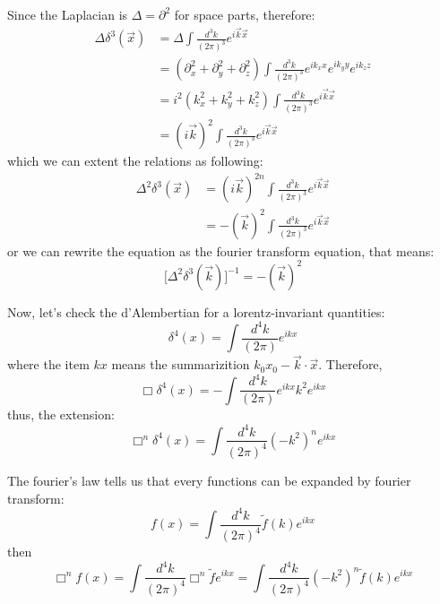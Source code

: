 \documentclass[12pt,openany]{book}
\begin{document}
	Since the Laplacian is $\Delta=\partial^2$ for space parts, therefore:
	\begin{equation*}
		\begin{aligned}
			\Delta\delta^3(\vec{x})&=\Delta\int\frac{d^3 k}{(2\pi)^3}e^{i\vec{k}\vec{x}}\\
			&=(\partial_x^2+\partial_y^2+\partial_z^2)\int\frac{d^3 k}{(2\pi)^3}e^{ik_x x}e^{ik_y y}e^{ik_z z}\\
			&=i^2(k_x^2+k_y^2+k_z^2)\int\frac{d^3 k}{(2\pi)^3}e^{i\vec{k}\vec{x}}\\
			&=(i\vec{k})^2\int\frac{d^3 k}{(2\pi)^3}e^{i\vec{k}\vec{x}}
		\end{aligned}
	\end{equation*}
	which we can extent the relations as following:
	\begin{equation}
		\begin{aligned}
			\Delta^2 \delta^3(\vec{x})&=(i\vec{k})^{2n}\int\frac{d^3 k}{(2\pi)^3}e^{i\vec{k}\vec{x}}\\
			&=-(\vec{k})^2 \int\frac{d^3 k}{(2\pi)^3}e^{i\vec{k}\vec{x}}
		\end{aligned}
	\end{equation}
	or we can rewrite the equation as the fourier transform equation, that means:
	\begin{equation}
		\big[\Delta^2 \delta^3(\vec{k})\big]^{-1}=-(\vec{k})^2
	\end{equation}\par 
	Now, let's check the d'Alembertian for a lorentz-invariant quantities:
	\begin{equation}
		\delta^4(x)=\int\frac{d^4k}{(2\pi)}e^{ikx}
	\end{equation}
	where the item $kx$ means the summarizition $k_0x_0-\vec{k}\cdot\vec{x}$. Therefore,
	\begin{equation}
		\Box \delta^4(x)=-\int\frac{d^4k}{(2\pi)}e^{ikx}k^2 e^{ikx}
	\end{equation}
	thus, the extension:
	\begin{equation}
		\Box^n\delta^4(x)=\int\frac{d^4k}{(2\pi)^4}(-k^2)^ne^{ikx}
	\end{equation}\par 
	The fourier's law tells us that every functions can be expanded by fourier transform:
	\begin{equation}
		f(x)=\int\frac{d^4k}{(2\pi)^4}\widetilde{f}(k)e^{ikx}
	\end{equation}
	then
	\begin{equation}
		\Box^nf(x)=\int \frac{d^4k}{(2\pi)^4} \Box^n\widetilde{f}e^{ikx}=\int\frac{d^4k}{(2\pi)^4}(-k^2)^n\widetilde{f}(k)e^{ikx}
	\end{equation}
\end{document}
